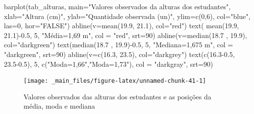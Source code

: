 \documentclass[
]{book}
\newenvironment{Shaded}{\begin{snugshade}}{\end{snugshade}}
\newcommand{\AttributeTok}[1]{\textcolor[rgb]{0.77,0.63,0.00}{#1}}
\newcommand{\DecValTok}[1]{\textcolor[rgb]{0.00,0.00,0.81}{#1}}
\newcommand{\FloatTok}[1]{\textcolor[rgb]{0.00,0.00,0.81}{#1}}
\newcommand{\FunctionTok}[1]{\textcolor[rgb]{0.00,0.00,0.00}{#1}}
\newcommand{\NormalTok}[1]{#1}
\newcommand{\SpecialCharTok}[1]{\textcolor[rgb]{0.00,0.00,0.00}{#1}}
\newcommand{\StringTok}[1]{\textcolor[rgb]{0.31,0.60,0.02}{#1}}
\begin{document}
\begin{Shaded}
\begin{Highlighting}[]
\FunctionTok{barplot}\NormalTok{(tab\_alturas,}
        \AttributeTok{main=}\StringTok{"Valores observados da alturas dos estudantes"}\NormalTok{,}
        \AttributeTok{xlab=}\StringTok{"Altura (cm)"}\NormalTok{,}
        \AttributeTok{ylab=}\StringTok{"Quantidade observada (un)"}\NormalTok{,}
        \AttributeTok{ylim=}\FunctionTok{c}\NormalTok{(}\DecValTok{0}\NormalTok{,}\DecValTok{6}\NormalTok{),}
        \AttributeTok{col=}\StringTok{"blue"}\NormalTok{,}
        \AttributeTok{las=}\DecValTok{0}\NormalTok{, }
        \AttributeTok{hor=}\StringTok{"FALSE"}\NormalTok{)}
\FunctionTok{abline}\NormalTok{(}\AttributeTok{v=}\FunctionTok{mean}\NormalTok{(}\FloatTok{19.9}\NormalTok{, }\FloatTok{21.1}\NormalTok{), }\AttributeTok{col=}\StringTok{"red"}\NormalTok{)}
\FunctionTok{text}\NormalTok{( }\FunctionTok{mean}\NormalTok{(}\FloatTok{19.9}\NormalTok{, }\FloatTok{21.1}\NormalTok{)}\SpecialCharTok{{-}}\FloatTok{0.5}\NormalTok{, }\DecValTok{5}\NormalTok{, }\StringTok{"Média=1,69 m"}\NormalTok{, }\AttributeTok{col =} \StringTok{"red"}\NormalTok{, }\AttributeTok{srt=}\DecValTok{90}\NormalTok{)}
\FunctionTok{abline}\NormalTok{(}\AttributeTok{v=}\FunctionTok{median}\NormalTok{(}\FloatTok{18.7}\NormalTok{ , }\FloatTok{19.9}\NormalTok{), }\AttributeTok{col=}\StringTok{"darkgreen"}\NormalTok{) }
\FunctionTok{text}\NormalTok{(}\FunctionTok{median}\NormalTok{(}\FloatTok{18.7}\NormalTok{ , }\FloatTok{19.9}\NormalTok{)}\SpecialCharTok{{-}}\FloatTok{0.5}\NormalTok{, }\DecValTok{5}\NormalTok{, }\StringTok{"Mediana=1,675 m"}\NormalTok{, }\AttributeTok{col =} \StringTok{"darkgreen"}\NormalTok{, }\AttributeTok{srt=}\DecValTok{90}\NormalTok{)}
\FunctionTok{abline}\NormalTok{(}\AttributeTok{v=}\FunctionTok{c}\NormalTok{(}\FloatTok{16.3}\NormalTok{, }\FloatTok{23.5}\NormalTok{), }\AttributeTok{col=}\StringTok{"darkgrey"}\NormalTok{) }
\FunctionTok{text}\NormalTok{(}\FunctionTok{c}\NormalTok{(}\FloatTok{16.3{-}0.5}\NormalTok{, }\FloatTok{23.5{-}0.5}\NormalTok{), }\DecValTok{5}\NormalTok{, }\FunctionTok{c}\NormalTok{(}\StringTok{"Moda=1,66"}\NormalTok{,}\StringTok{"Moda=1,73"}\NormalTok{), }\AttributeTok{col =} \StringTok{"darkgray"}\NormalTok{, }\AttributeTok{srt=}\DecValTok{90}\NormalTok{)}
\end{Highlighting}
\end{Shaded}

\begin{figure}

{\centering \texttt{[image: \_main\_files/figure-latex/unnamed-chunk-41-1]} 

}

\caption{Valores observados das alturas dos estudantes e as posições da média, moda e mediana}\label{fig:unnamed-chunk-41}
\end{figure}
\end{document}
